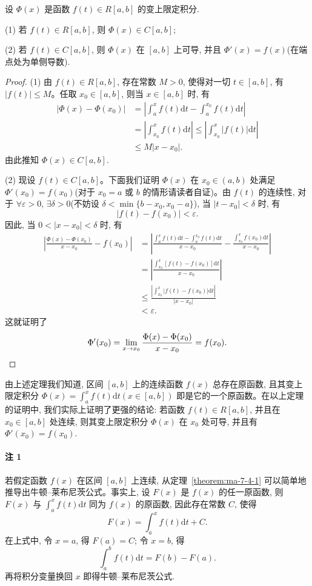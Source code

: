 \begin{theorem}\label{theorem:ma-7-4-1}
设 $\Phi(x)$ 是函数 $f(t)\in R[a,b]$ 的变上限定积分.

(1) 若 $f(t)\in R[a,b]$, 则 $\Phi(x)\in C[a,b]$;

(2) 若 $f(t)\in C[a,b]$, 则 $\Phi(x)$ 在 $[a,b]$ 上可导, 并且 $\Phi'(x)=f(x)$(在端点处为单侧导数).
\end{theorem}


\begin{proof}
(1) 由 $f(t)\in R[a,b]$, 存在常数 $M>0$, 使得对一切 $t\in[a,b]$, 有 $|f(t)|\leq M$。任取 $x_0\in[a,b]$, 则当 $x\in[a,b]$ 时, 有
\[
\begin{aligned}
  |\Phi(x)-\Phi(x_0)|
  &=\left|\int_a^x f(t)\mathrm dt-\int_a^{x_0} f(t)\mathrm dt\right|\\
  &=\left|\int_{x_0}^x f(t)\mathrm dt\right|
  \leq \left|\int_{x_0}^x |f(t)|\mathrm dt\right|\\
  &\leq M|x-x_0|.
\end{aligned}
\]
由此推知 $\Phi(x)\in C[a,b]$.

(2) 现设 $f(t)\in C[a,b]$。下面我们证明 $\Phi(x)$ 在 $x_0\in(a,b)$ 处满足 $\Phi'(x_0)=f(x_0)$(对于 $x_0=a$ 或 $b$ 的情形请读者自证)。由 $f(t)$ 的连续性, 对于 $\forall\varepsilon>0$, $\exists\delta>0$(不妨设 $\delta<\min\{b-x_0,x_0-a\}$), 当 $|t-x_0|<\delta$ 时, 有
\[
  |f(t)-f(x_0)|<\varepsilon.
\]
因此, 当 $0<|x-x_0|<\delta$ 时, 有
\[
\begin{aligned}
  \left|\frac{\Phi(x)-\Phi(x_0)}{x-x_0}-f(x_0)\right|
  &=\left|\frac{\int_a^x f(t)\mathrm dt-\int_a^{x_0} f(t)\mathrm dt}{x-x_0}
  -\frac{\int_{x_0}^x f(x_0)\mathrm dt}{x-x_0}\right|\\
  &=\left|\frac{\int_{x_0}^x [f(t)-f(x_0)]\mathrm dt}{x-x_0}\right|\\
  &\leq \frac{\left|\int_{x_0}^x |f(t)-f(x_0)|\mathrm dt\right|}{|x-x_0|}\\
  &<\varepsilon.
\end{aligned}
\]
这就证明了
\[
  \Phi'(x_0)=\lim_{x\to x_0}\frac{\Phi(x)-\Phi(x_0)}{x-x_0}=f(x_0).
\qedhere
\]
\end{proof}


由上述定理我们知道, 区间 $[a,b]$ 上的连续函数 $f(x)$ 总存在原函数, 且其变上限定积分 $\Phi(x)=\int_a^x f(t)\mathrm dt(x\in[a,b])$ 即是它的一个原函数。在以上定理的证明中, 我们实际上证明了更强的结论: 若函数 $f(t)\in R[a,b]$, 并且在 $x_0\in[a,b]$ 处连续, 则其变上限定积分 $\Phi(x)$ 在 $x_0$ 处可导, 并且有 $\Phi'(x_0)=f(x_0)$.

\paragraph*{注 1}
若假定函数 $f(x)$ 在区间 $[a,b]$ 上连续, 从定理~\ref{theorem:ma-7-4-1} 可以简单地推导出牛顿--莱布尼茨公式。事实上, 设 $F(x)$ 是 $f(x)$ 的任一原函数, 则 $F(x)$ 与 $\int_a^x f(t)\mathrm dt$ 同为 $f(x)$ 的原函数, 因此存在常数 $C$, 使得
\[
  F(x)=\int_a^x f(t)\mathrm dt+C.
\]
在上式中, 令 $x=a$, 得 $F(a)=C$; 令 $x=b$, 得
\[
  \int_a^b f(t)\mathrm dt=F(b)-F(a).
\]
再将积分变量换回 $x$ 即得牛顿--莱布尼茨公式.

